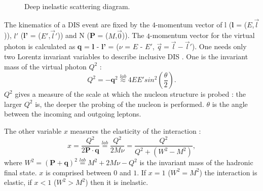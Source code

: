 \begin{figure}[!h]
  \centering

	\caption{Deep inelastic scattering diagram.}
	\label{pic:DIS}
\end{figure}

The kinematics of a DIS event are fixed by the $4$-momentum vector of l (\textbf{l} = ($E$,$\vec{l}$)), $l'$ (\textbf{l'} = ($E'$,$\vec{l}'$)) and N (\textbf{P} = ($M$,$\vec{0}$)). The $4$-momentum vector for the virtual photon is calculated as \textbf{q} = \textbf{l} - \textbf{l'} = ($\nu$ = $E$ - $E'$, $\vec{q}=\vec{l}-\vec{l}'$). One needs only two Lorentz invariant variables to describe inclusive DIS \cite{DISmeas}. One is the invariant mass of the virtual photon $Q^2$ :
%
\begin{equation}
  Q^2 = -\textbf{q}^2 \stackrel{lab}{\approx} 4EE'sin^2\left(\frac{\theta}{2}\right).
\end{equation}
%
$Q^2$ gives a measure of the scale at which the nucleon structure is probed : the larger $Q^2$ is, the deeper the probing of the nucleon is performed. $\theta$ is the angle between the incoming and outgoing leptons.

The other variable $x$ measures the elasticity of the interaction :
%
\begin{equation}
  x = \frac{Q^2}{2\textbf{P}\cdot\textbf{q}} \stackrel{lab}{=} \frac{Q^2}{2M\nu} = \frac{Q^2}{Q^2+(W^2-M^2)},
\end{equation}
%
where $W^2 = (\textbf{P}+\textbf{q})^2 \stackrel{lab}{=} M^2 + 2M\nu - Q^2$ is the invariant mass of the hadronic final state. $x$ is comprised between $0$ and $1$. If $x=1$ ($W^2=M^2$) the interaction is elastic, if $x<1$ ($W^2>M^2$) then it is inelastic.


